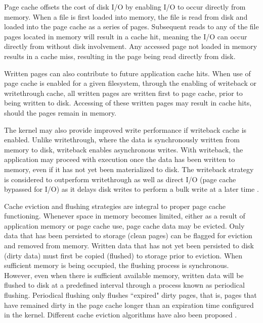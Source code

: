 \documentclass[conference]{IEEEtran}
\begin{document}
        Page cache offsets the cost of disk I/O by enabling I/O to occur directly from memory.
        When a file is first loaded into memory, the file is read from disk and loaded into the page cache as
        a series of pages. Subsequent reads to any of the file pages located in memory will result in
        a cache hit, meaning the I/O can occur directly from without disk involvement.
        Any accessed page not loaded in memory results in a cache miss, resulting in
        the page being read directly from disk.
        
        Written pages can also contribute to future application cache hits. When use of page cache
        is enabled for a given filesystem, through the enabling of writeback or writethrough cache,
        all written pages are written first to page cache, prior to being written to disk.
        Accessing of these written pages may result in cache hits, should the pages remain in memory.

        The kernel may also provide improved write performance if writeback cache is enabled. Unlike writethrough,
        where the data is synchronously written from memory to disk, writeback enables asynchronous writes.
        With writeback, the application may proceed with execution once the data has been
        written to memory, even if it has not yet been materialized to disk.  
        The writeback strategy is considered to outperform writethrough as well as
        direct I/O (page cache bypassed for I/O) as it delays disk writes to perform a bulk write at a later time
        \cite{linuxdev3rd2010}.

        Cache eviction and flushing strategies are integral to proper page cache functioning.
        Whenever space in memory becomes limited, either as a result of application memory
        or page cache use, page cache data may be evicted. Only data that
        has been persisted to storage (clean pages) can be flagged for eviction and removed from
        memory. Written data that has not yet been persisted to disk (dirty data) must first
        be copied (flushed) to storage prior to eviction. When sufficient memory is
        being occupied, the flushing process is synchronous. However, even when
        there is sufficient available memory, written data will be flushed to disk
        at a predefined interval through a process known as periodical flushing.
        Periodical flushing only flushes ``expired" dirty pages, that is, pages that
        have remained dirty in the
        page cache longer than an expiration time configured in the kernel.
        Different cache eviction algorithms have also been proposed
        \cite{owda2014comparison}.
\end{document}
